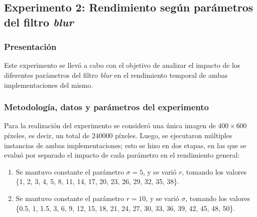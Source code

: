 

    \subsection{Experimento 2: Rendimiento según parámetros del filtro \emph{blur}}

        \subsubsection*{Presentación}
            Este experimento se llevó a cabo con el objetivo de analizar el impacto de los diferentes parámetros del filtro \emph{blur} en el rendimiento temporal de ambas implementaciones del mismo.

        \subsubsection*{Metodología, datos y parámetros del experimento}
            Para la realización del experimento se consideró una única imagen de $400 \times 600$ píxeles, es decir, un total de $240000$ píxeles. Luego, se ejecutaron múltiples instancias de ambas implementaciones; esto se hizo en dos etapas, en las que se evaluó por separado el impacto de cada parámetro en el rendimiento general:
            \begin{enumerate}[label=(\alph*)]
                 \item Se mantuvo constante el parámetro $\sigma = 5$, y se varió $r$, tomando los valores \{1, 2, 3, 4, 5, 8, 11, 14, 17, 20, 23, 26, 29, 32, 35, 38\}.
                 \item Se mantuvo constante el parámetro $r = 10$, y se varió $\sigma$, tomando los valores \{0.5, 1, 1.5, 3, 6, 9, 12, 15, 18, 21, 24, 27, 30, 33, 36, 39, 42, 45, 48, 50\}.
             \end{enumerate}

